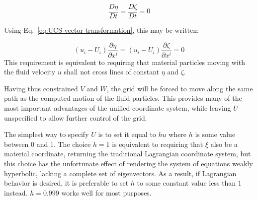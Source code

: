 \[\frac{{D\eta }}{{Dt}} = \frac{{D\zeta }}{{Dt}}=0\]

Using Eq.~\ref{eq:UCS-vector-transformation}, this may be written:

\begin{equation}
\label{eq:material-coordinates}
\left( {{u_i} - {U_i}} \right)\frac{{\partial \eta }}{{\partial {x^i}}} = \left( {{u_i} - {U_i}} \right)\frac{{\partial \zeta }}{{\partial {x^i}}} = 0
\end{equation}
This requirement is equivalent to requiring that material particles moving with the fluid velocity $u$ shall not cross lines of constant $\eta$ and $\zeta$. 

Having thus constrained $V$ and $W$, the grid will be forced to move along the same path as the computed motion of the fluid particles. This provides many of the most important advantages of the unified coordinate system, while leaving $U$ unspecified to allow further control of the grid. 

The simplest way to specify $U$ is to set it equal to $hu$ where $h$ is some  value between $0$ and $1$. The choice $h=1$ is equivalent to requiring that $\xi$ also be a material coordinate, returning the traditional Lagrangian coordinate system, but this choice has the unfortunate effect of rendering the system of equations weakly hyperbolic, lacking a complete set of eigenvectors. As a result, if Lagrangian behavior is desired, it is preferable to set $h$ to some constant value less than $1$ instead. $h=0.999$ works well for most purposes.

